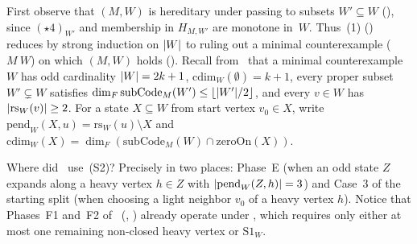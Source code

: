 \begin{outline}
First observe that $(M, W)$ is hereditary under passing to subsets $W' \subseteq W$ (),
since $(\star 4)_{W'}$ and membership in $H_{M,W'}$ are monotone in~$W$. Thus~(1) ()
reduces by strong induction on $\lvert W \rvert$ to ruling out a minimal counterexample ( $M\ W$) on
which $(M, W)$ holds (). Recall from~\cite[Section~8.2]{EighthPaper2026} that a
minimal counterexample $W$ has odd cardinality $\lvert W \rvert = 2k + 1$, $\mathrm{cdim}_W(\emptyset) = k + 1$, every proper
subset $W' \subsetneq W$ satisfies $\dim_F \mathrm{subCode}_M(W') \le \lfloor \lvert W' \rvert/2 \rfloor$, and every $v \in W$ has
$\lvert \mathrm{rs}_W(v) \rvert \ge 2$. For a state $X \subseteq W$ from start vertex $v_0 \in X$, write
$\mathrm{pend}_W(X, u) = \mathrm{rs}_W(u) \setminus X$ and $\mathrm{cdim}_W(X) = \dim_F(\mathrm{subCode}_M(W) \cap
\mathrm{zeroOn}(X))$.

Where did~\cite{EighthPaper2026} use~(S2)? Precisely in two places: Phase~E (when an odd state $Z$ expands along a heavy
vertex $h \in Z$ with $\lvert \mathrm{pend}_W(Z, h) \rvert = 3$) and Case~3 of the starting split (when choosing a light neighbor
$v_0$ of a heavy vertex $h$). Notice that Phases~F1 and~F2 of~\cite{EighthPaper2026} (,
) already operate under , which requires only either at most one
remaining non-closed heavy vertex or $\mathrm{S1}_W$.


\end{outline}
